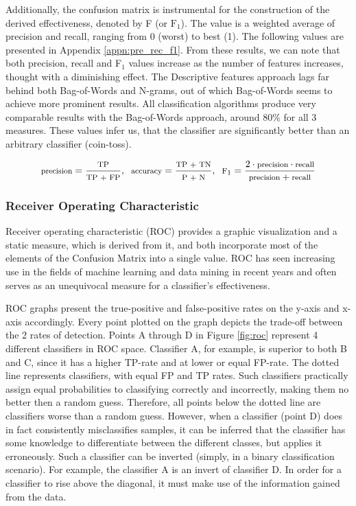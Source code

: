 		Additionally, the confusion matrix is instrumental for the construction of the derived effectiveness, denoted by F (or $ \text{F}_1 $). The value is a weighted average of precision and recall, ranging from 0 (worst) to best (1). The following values are presented in Appendix \ref{appn:pre_rec_f1}. From these results, we can note that both precision, recall and F$_1$ values increase as the number of features increases, thought with a diminishing effect. The Descriptive features approach lags far behind both Bag-of-Words and N-grams, out of which Bag-of-Words seems to achieve more prominent results. All classification algorithms produce very comparable results with the Bag-of-Words approach, around 80\% for all 3 measures. These values infer us, that the classifier are significantly better than an arbitrary classifier (coin-toss).
		
		\begin{equation}
			\footnotesize
				\text{precision} = \frac{\text{TP}}{\text{TP + FP}}, \ \
				\text{accuracy} = \frac{\text{TP + TN}}{\text{P + N}}, \ \
				\text{F}_1 = \frac{2 \cdot \text{precision} \cdot \text{recall}}{\text{precision} + \text{recall}}
		\label{precision}
		\end{equation}
		
		
		\subsubsection{Receiver Operating Characteristic}
		Receiver operating characteristic (ROC) provides a graphic visualization and a static measure, which is derived from it, and both incorporate most of the elements of the Confusion Matrix into a single value. ROC has seen increasing use in the fields of machine learning and data mining in recent years and often serves as an unequivocal measure for a classifier's effectiveness.
		
		\par
	
		ROC graphs present the true-positive and false-positive rates on the y-axis and x-axis accordingly. Every point plotted on the graph depicts the trade-off between the 2 rates of detection. Points A through D in Figure \ref{fig:roc} represent 4 different classifiers in ROC space. Classifier A, for example, is superior to both B and C, since it has a higher TP-rate and at lower or equal FP-rate. The dotted line represents classifiers, with equal FP and TP rates. Such classifiers practically assign equal probabilities to classifying correctly and incorrectly, making them no better then a random guess. Therefore, all points below the dotted line are classifiers worse than a random guess. However, when a classifier (point D) does in fact consistently misclassifies samples, it can be inferred that the classifier has some knowledge to differentiate between the different classes, but applies it erroneously. Such a classifier can be inverted (simply, in a binary classification scenario). For example, the classifier A is an invert of classifier D. In order for a classifier to rise above the diagonal, it must make use of the information gained from the data.
		
